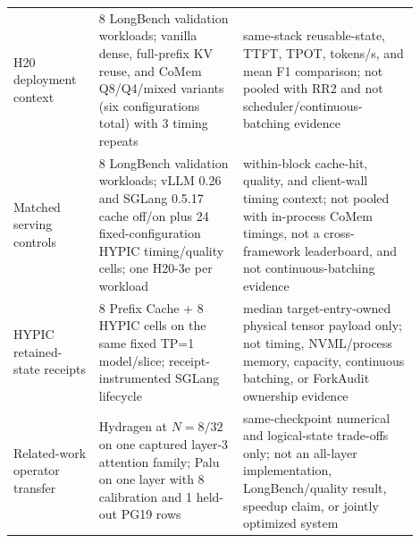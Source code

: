 \documentclass{article}
\begin{document}
\begin{table}[H]
\begin{tabular}{@{}p{0.19\linewidth}p{0.32\linewidth}p{0.39\linewidth}@{}}
    H20 deployment context & 8 LongBench validation workloads; vanilla dense, full-prefix KV reuse, and CoMem Q8/Q4/mixed variants (six configurations total) with 3 timing repeats & same-stack reusable-state, TTFT, TPOT, tokens/s, and mean F1 comparison; not pooled with RR2 and not scheduler/continuous-batching evidence \\
    Matched serving controls & 8 LongBench validation workloads; vLLM 0.26 and SGLang 0.5.17 cache off/on plus 24 fixed-configuration HYPIC timing/quality cells; one H20-3e per workload & within-block cache-hit, quality, and client-wall timing context; not pooled with in-process CoMem timings, not a cross-framework leaderboard, and not continuous-batching evidence \\
    HYPIC retained-state receipts & 8 Prefix Cache + 8 HYPIC cells on the same fixed TP=1 model/slice; receipt-instrumented SGLang lifecycle & median target-entry-owned physical tensor payload only; not timing, NVML/process memory, capacity, continuous batching, or ForkAudit ownership evidence \\
    Related-work operator transfer & Hydragen at $N=8/32$ on one captured layer-3 attention family; Palu on one layer with 8 calibration and 1 held-out PG19 rows & same-checkpoint numerical and logical-state trade-offs only; not an all-layer implementation, LongBench/quality result, speedup claim, or jointly optimized system \\
    \bottomrule
  \end{tabular}
\end{table}
\end{document}
